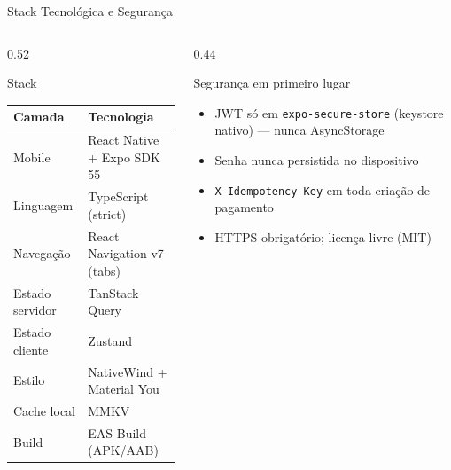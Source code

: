 \documentclass[10pt, aspectratio=169]{beamer}
\begin{document}
\begin{frame}{Stack Tecnológica e Segurança}
    \begin{columns}[T]
        \begin{column}{0.52\textwidth}
            \begin{block}{Stack}
                \small
                \begin{tabular}{@{}ll@{}}
                    \toprule
                    \textbf{Camada} & \textbf{Tecnologia} \\
                    \midrule
                    Mobile & React Native + Expo SDK 55 \\
                    Linguagem & TypeScript (strict) \\
                    Navegação & React Navigation v7 (tabs) \\
                    Estado servidor & TanStack Query \\
                    Estado cliente & Zustand \\
                    Estilo & NativeWind + Material You \\
                    Cache local & MMKV \\
                    Build & EAS Build (APK/AAB) \\
                    \bottomrule
                \end{tabular}
            \end{block}
        \end{column}
        \begin{column}{0.44\textwidth}
            \begin{alertblock}{Segurança em primeiro lugar}
                \small
                \begin{itemize}
                    \item JWT só em \texttt{expo-secure-store} (keystore nativo) --- nunca AsyncStorage
                    \item Senha nunca persistida no dispositivo
                    \item \texttt{X-Idempotency-Key} em toda criação de pagamento
                    \item HTTPS obrigatório; licença livre (MIT)
                \end{itemize}
            \end{alertblock}
        \end{column}
    \end{columns}
\end{frame}
\end{document}

